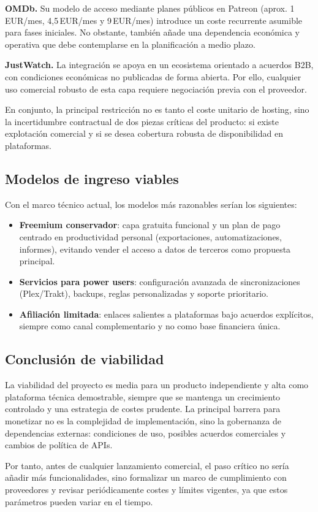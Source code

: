 \textbf{OMDb.} Su modelo de acceso mediante planes públicos en Patreon (aprox. 1\,EUR/mes, 4,5\,EUR/mes y 9\,EUR/mes) introduce un coste recurrente asumible para fases iniciales. No obstante, también añade una dependencia económica y operativa que debe contemplarse en la planificación a medio plazo.

\textbf{JustWatch.} La integración se apoya en un ecosistema orientado a acuerdos B2B, con condiciones económicas no publicadas de forma abierta. Por ello, cualquier uso comercial robusto de esta capa requiere negociación previa con el proveedor.

En conjunto, la principal restricción no es tanto el coste unitario de hosting, sino la incertidumbre contractual de dos piezas críticas del producto: si existe explotación comercial y si se desea cobertura robusta de disponibilidad en plataformas.

\subsection{Modelos de ingreso viables}

Con el marco técnico actual, los modelos más razonables serían los siguientes:

\begin{itemize}
\item \textbf{Freemium conservador}: capa gratuita funcional y un plan de pago centrado en productividad personal (exportaciones, automatizaciones, informes), evitando vender el acceso a datos de terceros como propuesta principal.
\item \textbf{Servicios para power users}: configuración avanzada de sincronizaciones (Plex/Trakt), backups, reglas personalizadas y soporte prioritario.
\item \textbf{Afiliación limitada}: enlaces salientes a plataformas bajo acuerdos explícitos, siempre como canal complementario y no como base financiera única.
\end{itemize}

\subsection{Conclusión de viabilidad}

La viabilidad del proyecto es media para un producto independiente y alta como plataforma técnica demostrable, siempre que se mantenga un crecimiento controlado y una estrategia de costes prudente. La principal barrera para monetizar no es la complejidad de implementación, sino la gobernanza de dependencias externas: condiciones de uso, posibles acuerdos comerciales y cambios de política de APIs.

Por tanto, antes de cualquier lanzamiento comercial, el paso crítico no sería añadir más funcionalidades, sino formalizar un marco de cumplimiento con proveedores y revisar periódicamente costes y límites vigentes, ya que estos parámetros pueden variar en el tiempo.
